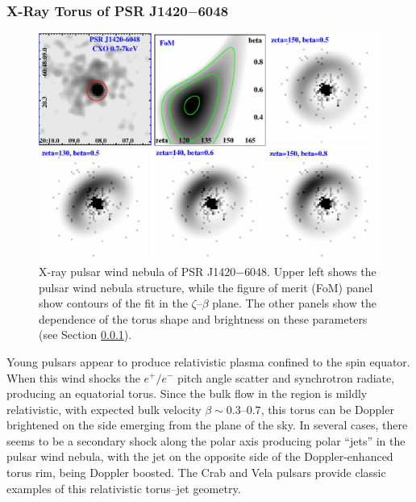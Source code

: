 \subsubsection{X-Ray Torus of PSR J1420$-$6048}
\label{sec:xray}
\begin{figure}[t!!]
\begin{center}
\includegraphics[scale=.8]{chapters/applicationOfNumericalModel/figures/J1420_torfit_comp.eps}
\caption[X-ray pulsar wind nebula of PSR J1420$-$6048]{\label{fig:xraytorus}
X-ray pulsar wind nebula of PSR J1420$-$6048. Upper left shows the pulsar wind nebula structure,
while the figure of merit (FoM) panel show contours of the fit in the $\zeta$--$\beta$ plane. The
other panels show the dependence of the torus shape and brightness on these 
parameters (see Section \ref{sec:xray}).
}
\end{center}
\end{figure}

Young pulsars appear to produce relativistic plasma confined
to the spin equator. When this wind shocks the $e^+/e^-$ pitch angle scatter and
synchrotron radiate, producing an equatorial torus. Since the bulk flow in the
region is mildly relativistic, with expected bulk velocity $\beta \sim 0.3$--$0.7$,
this torus can be Doppler brightened on the side emerging from the plane of the sky.
In several cases, there seems to be a secondary shock along the polar axis producing
polar ``jets'' in the pulsar wind nebula, 
with the jet on the opposite side of the Doppler-enhanced torus
rim, being Doppler boosted. The Crab and Vela pulsars provide classic examples of this
relativistic torus--jet geometry.

